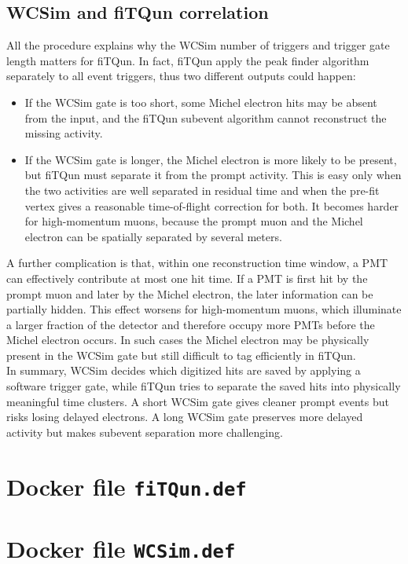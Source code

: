 \documentclass{article}
\numberwithin{table}{subsection}
\numberwithin{figure}{subsection}
\numberwithin{equation}{subsection}
\numberwithin{footnote}{subsection}
\begin{document}
\subsection{WCSim and fiTQun correlation}
All the procedure explains why the WCSim number of triggers and trigger gate length matters for fiTQun. In fact, fiTQun apply the peak finder algorithm separately to all event triggers, thus two different outputs could happen:
\begin{itemize}
    \item  If the
WCSim gate is too short, some Michel electron hits may be absent from the
input, and the fiTQun subevent algorithm cannot reconstruct the missing
activity.
\item If the WCSim gate is longer, the Michel electron is more likely to
be present, but fiTQun must separate it from the prompt activity. This is
easy only when the two activities are well separated in residual time and
when the pre-fit vertex gives a reasonable time-of-flight correction for both.
It becomes harder for high-momentum muons, because the prompt muon and the
Michel electron can be spatially separated by several meters.
\end{itemize}
A further complication is that, within one reconstruction time window, a PMT
can effectively contribute at most one hit time. If a PMT is first hit by the
prompt muon and later by the Michel electron, the later information can be
partially hidden. This effect worsens for high-momentum muons, which
illuminate a larger fraction of the detector and therefore occupy more PMTs
before the Michel electron occurs. In such cases the Michel electron may be
physically present in the WCSim gate but still difficult to tag efficiently in
fiTQun.\\
\newline
In summary, WCSim decides which digitized hits are saved by applying a
software trigger gate, while fiTQun tries to separate the saved hits into
physically meaningful time clusters. A short WCSim gate gives cleaner prompt
events but risks losing delayed electrons. A long WCSim gate preserves more
delayed activity but makes subevent separation more challenging.


\newpage

\appendix
\section{Docker file \texttt{fiTQun.def}}
\label{Appendix_A}



\section{Docker file \texttt{WCSim.def}}
\label{Appendix_B}

\end{document}
